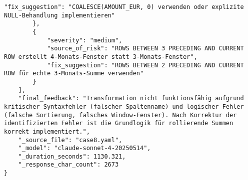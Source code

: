 \begin{lstlisting}[caption={Ausgabe: Claude Sonnet 4 Anwendungsfall 8 Hauptdurchlauf},label={claude_case8_prompt1}]
            "fix_suggestion": "COALESCE(AMOUNT_EUR, 0) verwenden oder explizite NULL-Behandlung implementieren"
        },
        {
            "severity": "medium",
            "source_of_risk": "ROWS BETWEEN 3 PRECEDING AND CURRENT ROW erstellt 4-Monats-Fenster statt 3-Monats-Fenster",
            "fix_suggestion": "ROWS BETWEEN 2 PRECEDING AND CURRENT ROW für echte 3-Monats-Summe verwenden"
        }
    ],
    "final_feedback": "Transformation nicht funktionsfähig aufgrund kritischer Syntaxfehler (falscher Spaltenname) und logischer Fehler (falsche Sortierung, falsches Window-Fenster). Nach Korrektur der identifizierten Fehler ist die Grundlogik für rollierende Summen korrekt implementiert.",
    "_source_file": "case8.yaml",
    "_model": "claude-sonnet-4-20250514",
    "_duration_seconds": 1130.321,
    "_response_char_count": 2673
}
\end{lstlisting}

